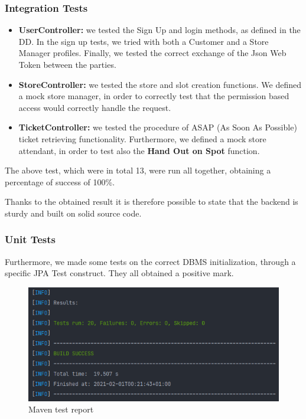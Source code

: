 \documentclass[table, 12pt]{article}
\begin{document}
\subsubsection*{Integration Tests}
\begin{itemize}
    \item \textbf{UserController:} we tested the Sign Up and login methods, as defined in the DD. In the sign up tests, we tried with both a Customer and a Store Manager profiles. Finally, we tested the correct exchange of the Json Web Token between the parties.
    \item \textbf{StoreController:} we tested the store and slot creation functions. We defined a mock store manager, in order to correctly test that the permission based access would correctly handle the request.
    \item \textbf{TicketController:} we tested the procedure of ASAP (As Soon As Possible) ticket retrieving functionality. Furthermore, we defined a mock store attendant, in order to test also the \textbf{Hand Out on Spot} function.
\end{itemize}

The above test, which were in total 13, were run all together, obtaining a percentage of success of 100\%.

Thanks to the obtained result it is therefore possible to state that the backend is sturdy and built on solid source code.

\subsubsection*{Unit Tests}
Furthermore, we made some tests on the correct DBMS initialization, through a specific JPA Test construct. They all obtained a positive mark.
\begin{figure}[H]
    \includegraphics[width=\textwidth]{assets/mvn.png}
    \caption{Maven test report}
\end{figure}
\end{document}
